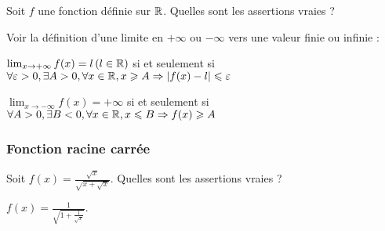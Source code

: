 \begin{question} 

Soit  $f$ une fonction définie sur $\mathbb{R}$. Quelles sont les assertions vraies ?
\begin{answers}

    
    
       
    
\end{answers}
\begin{explanations}
Voir la définition d'une limite en $+\infty$ ou $-\infty$ vers une valeur finie ou infinie :

$\lim_{x\to +\infty} f(x)=l \, (l\in \mathbb{R})$  si et seulement si $\forall \varepsilon >0,  \exists A >0, \forall x \in \mathbb{R}, x\geqslant A \Rightarrow |f(x)-l|\leqslant \varepsilon$

$\lim_{x\to -\infty} f(x)=+\infty$  si et seulement si $ \forall A >0,  \exists B <0, \forall x \in \mathbb{R}, x\leqslant B \Rightarrow f(x)\geqslant A$
\end{explanations}

\end{question}


\subsubsection{Fonction racine carrée}

\begin{question}

Soit $f(x)= \frac{\sqrt x}{\sqrt{x+\sqrt{x}}}$. Quelles sont les assertions vraies ?
\begin{answers}

    
    
    
    


\end{answers}
\begin{explanations}
$f(x)= \frac{1}{\sqrt{1+\frac{1}{\sqrt{x}}}}.$
\end{explanations}

\end{question}




